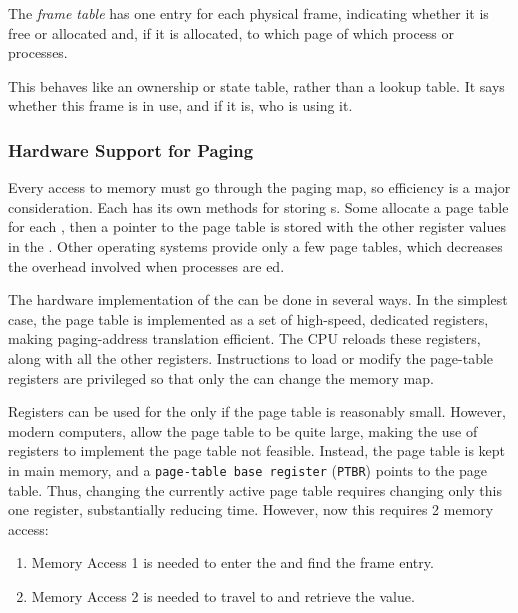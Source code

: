 \begin{definition}\label{def:Frame_Table}
  The \emph{frame table} has one entry for each physical frame, indicating whether it is free or allocated and, if it is allocated, to which page of which process or processes.

  This behaves like an ownership or state table, rather than a lookup table.
  It says whether this frame is in use, and if it is, who is using it.
\end{definition}

\subsubsection{Hardware Support for Paging}\label{subsubsec:Paging_Hardware_Support}
Every access to memory must go through the paging map, so efficiency is a major consideration.
Each  has its own methods for storing s.
Some allocate a page table for each , then a pointer to the page table is stored with the other register values in the .
Other operating systems provide only a few page tables, which decreases the overhead involved when processes are ed.

The hardware implementation of the  can be done in several ways.
In the simplest case, the page table is implemented as a set of high-speed, dedicated registers, making paging-address translation efficient.
The CPU  reloads these registers, along with all the other registers.
Instructions to load or modify the page-table registers are privileged so that only the  can change the memory map.

Registers can be used for the  only if the page table is reasonably small.
However, modern computers, allow the page table to be quite large, making the use of registers to implement the page table not feasible.
Instead, the page table is kept in main memory, and a \texttt{page-table base register} (\texttt{PTBR}) points to the page table.
Thus, changing the currently active page table requires changing only this one register, substantially reducing  time.
However, now this requires 2 memory access:
\begin{enumerate}[noitemsep]
\item Memory Access 1 is needed to enter the  and find the frame entry.
\item Memory Access 2 is needed to travel to  and retrieve the value.
\end{enumerate}


